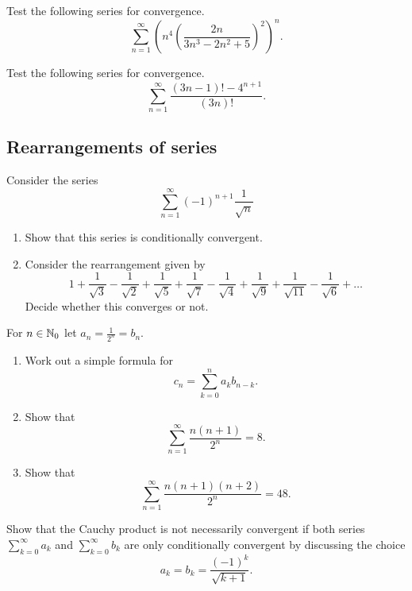 \documentclass[10pt, a4paper]{article}
\renewcommand{\infsum}[1][n = 1]{\sum_{#1}^{\infty}}
\begin{document}
\begin{example}
    Test the following series for convergence.
    \[
    \infsum \left(n ^ 4\left(\frac{2n}{3n ^ 3 - 2n ^ 2 + 5}\right) ^ 2\right) ^ n.
    \]
\end{example}

\begin{example}
    Test the following series for convergence.
    \[
    \infsum \frac{(3n - 1)! - 4 ^ {n + 1}}{(3n)!}.
    \]
\end{example}

\subsection{Rearrangements of series}

\begin{example}
    Consider the series
    \[
    \infsum (-1)^{n + 1} \frac{1}{\sqrt{n}}
    \]
    \begin{enumerate}[label = \alph*.]
        \item Show that this series is conditionally convergent.
        \item Consider the rearrangement given by
        \[
        1 + \frac{1}{\sqrt{3}} - \frac{1}{\sqrt{2}} + \frac{1}{\sqrt{5}} + \frac{1}{\sqrt{7}} - \frac{1}{\sqrt{4}} + \frac{1}{\sqrt{9}} + \frac{1}{\sqrt{11}} - \frac{1}{\sqrt{6}} + \dotsc
        \]
        Decide whether this converges or not.
    \end{enumerate}
\end{example}

\begin{example}
    For $n \in \mathbb{N}_0$ let $a_n = \frac{1}{2 ^ n} = b_n$.
    \begin{enumerate}[label = \alph*.]
        \item Work out a simple formula for
        \[
        c_n = \sum_{k = 0}^n a_k b_{n - k}.
        \]
        \item Show that
        \[
        \infsum \frac{n(n + 1)}{2 ^ n} = 8.
        \]
        \item Show that
        \[
        \infsum \frac{n(n + 1)(n + 2)}{2 ^ n} = 48.
        \]
    \end{enumerate}
\end{example}

\begin{example}
    Show that the Cauchy product is not necessarily convergent if both series $\infsum[k = 0] a_k$ and $\infsum[k = 0] b_k$ are only conditionally convergent by discussing the choice
    \[
    a_k = b_k = \frac{(-1) ^ k}{\sqrt{k + 1}}.
    \]
\end{example}
\end{document}

